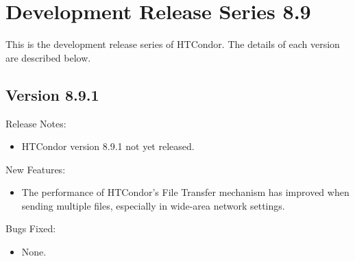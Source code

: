 
\section{Development Release Series 8.9}\label{sec:History-8-9}

This is the development release series of HTCondor.
The details of each version are described below.

\subsection*{\label{sec:New-8-9-1}Version 8.9.1}

\noindent Release Notes:

\begin{itemize}

\item HTCondor version 8.9.1 not yet released.

\end{itemize}


\noindent New Features:

\begin{itemize}

\item The performance of HTCondor's File Transfer mechanism has improved when
	sending multiple files, especially in wide-area network settings.

\end{itemize}

\noindent Bugs Fixed:

\begin{itemize}

\item None.

\end{itemize}

